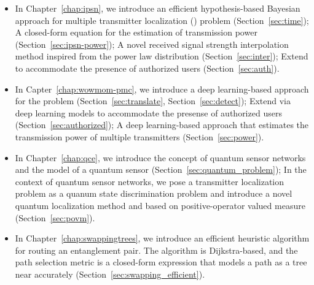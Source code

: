 \begin{itemize}
    \item In Chapter~\ref{chap:ipsn}, we introduce an efficient hypothesis-based Bayesian approach \ouralgo for multiple transmitter localization (\mtl) problem (Section~\ref{sec:time}); 
          A closed-form equation for the estimation of transmission power (Section~\ref{sec:ipsn-power});
          A novel received signal strength interpolation method inspired from the power law distribution (Section~\ref{sec:inter});
          Extend \ouralgo to accommodate the presence of authorized users (Section~\ref{sec:auth}).
    \item In Capter~\ref{chap:wowmom-pmc}, we introduce a deep learning-based approach \our for the \mtl problem (Section~\ref{sec:translate}, Section~\ref{sec:detect});
          Extend \our via deep learning models to accommodate the presense of authorized users (Section~\ref{sec:authorized});
          A deep learning-based approach that estimates the transmission power of multiple transmitters (Section~\ref{sec:power}).
    \item In Chapter~\ref{chap:qce}, we introduce the concept of quantum sensor networks and the model of a quantum sensor (Section~\ref{sec:quantum_problem});
          In the context of quantum sensor networks, we pose a transmitter localization problem as a quanum state discrimination problem 
          and introduce a novel quantum localization method \povm and \povmpro based on positive-operator valued measure (Section~\ref{sec:povm}).
    \item In Chapter~\ref{chap:swappingtrees}, we introduce an efficient heuristic algorithm \dpalt for routing an entanglement pair.
          The algorithm is Dijkstra-based, and the path selection metric is a closed-form expression that models a path as a tree near accurately (Section~\ref{sec:swapping_efficient}).
\end{itemize}



